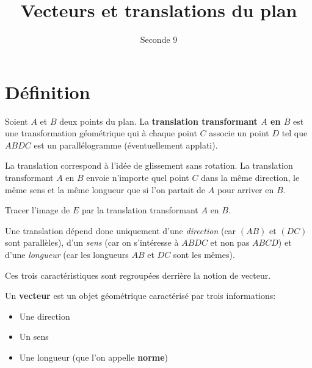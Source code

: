 \documentclass{article}
\title{Vecteurs et translations du plan}
\date{}
\author{Seconde 9}
\begin{document}
\maketitle
\section{Définition}
\begin{tcolorbox}
\begin{definition}
Soient $A$ et $B$ deux points du plan. La \textbf{translation transformant $A$ en $B$} est une transformation géométrique qui à chaque point $C$ associe un point $D$ tel que $ABDC$ est un parallélogramme (éventuellement applati).     
\end{definition}
\end{tcolorbox}
\begin{example}

\begin{minipage}{0.45\textwidth}
\begin{center}
\end{center}    
\end{minipage}
\hfill
\begin{minipage}{0.45\textwidth}
La translation correspond à l'idée de \og glissement \fg sans rotation. La translation transformant $A$ en $B$ envoie n'importe quel point $C$ dans la même direction, le même sens et la même longueur que si l'on partait de $A$ pour arriver en $B$.

Tracer l'image de $E$ par la translation transformant $A$ en $B$.
\end{minipage}
\end{example}
\begin{remark}
Une translation dépend donc uniquement d'une \emph{direction} (car $(AB)$ et $(DC)$ sont parallèles), d'un \emph{sens} (car on s'intéresse à $ABDC$ et non pas $ABCD$) et d'une \emph{longueur} (car les longueurs $AB$ et $DC$ sont les mêmes). 

Ces trois caractéristiques sont regroupées derrière la notion de vecteur. 
\end{remark}
\begin{tcolorbox}
\begin{definition}
Un \textbf{vecteur} est un objet géométrique caractérisé par trois informations:
\begin{itemize}
\item Une direction
\item Un sens
\item Une longueur (que l'on appelle \textbf{norme})
\end{itemize}
\end{definition}
\end{tcolorbox}
\end{document}
